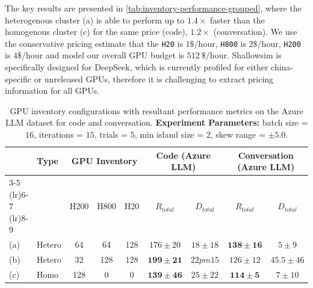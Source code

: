 The key results are presented in \autoref{tab:inventory-performance-grouped}, where the heterogenous cluster (a) is able to perform up to $1.4 \times$ faster than the homogenous cluster (c) for the same price (code), $1.2 \times$ (conversation).
We use the conservative pricing estimate that the \texttt{H20} is $1\$/\text{hour}$, \texttt{H800} is $2\$/\text{hour}$, \texttt{H200} is $4\$/\text{hour}$ and model our overall GPU budget is $512\ \$/\text{hour}$.
Shallowsim is specifically designed for DeepSeek, which is currently profiled for either china-specific or unreleased GPUs, therefore it is challenging to extract pricing information for all GPUs.


\begin{table}[ht]
  \centering
  \begin{tabular}{@{} l l ccc cc cc @{}}
    \toprule
    \multirow{2}{*}{} & \multirow{2}{*}{Type} & \multicolumn{3}{c}{GPU Inventory} & \multicolumn{2}{c}{Code (Azure LLM)} & \multicolumn{2}{c}{Conversation (Azure LLM)} \\
    
    \cmidrule(lr){3-5} \cmidrule(lr){6-7} \cmidrule(lr){8-9}
    
    & & H200 & H800 & H20 & $R_{total}$ & $D_{total}$ & $R_{total}$ & $D_{total}$ \\
    \midrule
    
    (a) & Hetero & 64  & 64  & 128 & $176\pm20$ & $18\pm18$ & $\bm{138\pm16}$ & $5\pm9$\\
    (b) & Hetero & 32  & 128 & 128 & $\bm{199\pm21}$ & $22pm15$ & $126\pm12$ & $45.5\pm46$\\
    (c) & Homo  & 128 & 0 & 0 & $\bm{139\pm46}$ &  $25\pm22$ & $\bm{114\pm5}$ & $7\pm10$\\
    \bottomrule
  \end{tabular}
  \caption[GPU inventory configurations with resultant performance metrics on the Azure LLM dataset for code and conversation.]{GPU inventory configurations with resultant performance metrics on the Azure LLM dataset for code and conversation. \textbf{Experiment Parameters:} batch size = $16$, iterations = $15$, trials = $5$, min island size = $2$, skew range = $\pm 5.0$.}
  \label{tab:inventory-performance-grouped}
\end{table}

